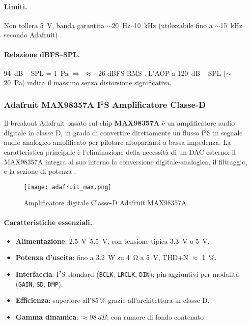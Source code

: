 \paragraph{Limiti.} Non tollera \SI{5}{V}, banda garantita $\sim$\SI{20}{Hz}--\SI{10}{kHz} (utilizzabile fino a $\sim$\SI{15}{kHz} secondo Adafruit) 
\citep[p.~2]{adafruit-sph0645-datasheet}.

\paragraph{Relazione dBFS--SPL.}
\SI{94}{dB\,SPL} = \SI{1}{Pa} $\Rightarrow$ $\approx -26$ dBFS RMS \citep[p.~2]{adafruit-sph0645-datasheet}. 
L’AOP a \SI{120}{dB\,SPL} ($\sim$\SI{20}{Pa}) indica il massimo senza distorsione significativa.

\newpage
\subsubsection{Adafruit MAX98357A I$^2$S Amplificatore Classe-D}
\label{subsec:amplificatore}

Il breakout Adafruit basato sul chip \textbf{MAX98357A} è un amplificatore audio digitale in classe D, in grado di convertire direttamente un flusso
 I$^2$S in segnale audio analogico amplificato per pilotare altoparlanti a bassa impedenza. 
La caratteristica principale è l’eliminazione della necessità di un DAC esterno: il MAX98357A integra al suo interno la conversione digitale-analogica, 
il filtraggio, e la sezione di potenza \citep{adafruit-max98357-datasheet}.
\begin{figure}[H]
  \centering
  \texttt{[image: adafruit\_max.png]}
  \caption{Amplificatore digitale Classe-D Adafruit MAX98357A.}
  \label{fig:adafruit_max}
  \end{figure}
\paragraph{Caratteristiche essenziali.}
\begin{itemize}
  \item \textbf{Alimentazione}: \SIrange{2.5}{5.5}{V}, con tensione tipica \SI{3.3}{V} o \SI{5}{V}. 
  \item \textbf{Potenza d’uscita}: fino a \SI{3.2}{W} su \SI{4}{\ohm} a \SI{5}{V}, THD+N $\approx$ \SI{1}{\%}.
  \item \textbf{Interfaccia}: I$^2$S standard (\texttt{BCLK}, \texttt{LRCLK}, \texttt{DIN}); pin aggiuntivi per modalità (\texttt{GAIN}, \texttt{SD}, \texttt{DMP}).
  \item \textbf{Efficienza}: superiore all’$\SI{85}{\%}$ grazie all’architettura in classe D.
  \item \textbf{Gamma dinamica}: $\approx \SI{98}{dB}$, con rumore di fondo contenuto \citep[p.~16]{adafruit-max98357-datasheet}.
\end{itemize}


